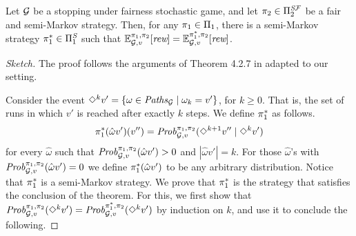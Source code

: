 \begin{theorem}\label{th:semmimarkov2}
  Let $\mathcal{G}$ be a stopping under fairness stochastic game,  and let
  $\pi_{2} \in \Pi^{\textit{S}\mathcal{F}}_{2}$ be a fair and semi-Markov
  strategy. Then, for any $\pi_{1} \in \Pi_{1}$, there is a
  semi-Markov strategy $\pi^*_{1} \in \Pi^{\textit{S}}_{1}$
  such that
  $\mathbb{E}^{\pi_{1}, \pi_{2}}_{\mathcal{G}, v}[\textit{rew}] =
  \mathbb{E}^{\pi^*_{1}, \pi_{2}}_{\mathcal{G}, v}[\textit{rew}]$.
\end{theorem}
%
\begin{proof}[Sketch]
  The proof follows the arguments of Theorem 4.2.7 in \cite{FilarV96}
  adapted to our setting.
	
  Consider the event $\Diamond^{k} v' = \{ \omega \in
  \mathit{Paths}_{\mathcal{G}} \mid \omega_k = v'\}$, for $k\geq 0$. That is,
  the set of runs in which $v'$ is reached after exactly $k$ steps.
  We define $\pi^*_{1}$ as follows.
  \[
  \pi^*_{1}(\hat{\omega}v')(v'') =  \mathit{Prob}^{\pi_{1}, \pi_{2}}_{\mathcal{G},v}(\Diamond^{k+1} v'' \mid \Diamond^k v') 
  \]
  for every $\hat{\omega}$ such that $\mathit{Prob}^{\pi_{1}, \pi_{2}}_{\mathcal{G},v}(\hat{\omega}v') > 0$ and $|\hat{\omega}v'| = k$.  For those $\hat{\omega}$'s with $\mathit{Prob}^{\pi_{1}, \pi_{2}}_{\mathcal{G},v}(\hat{\omega}v') = 0$ we define $\pi^*_{1}(\hat{\omega}v')$ to be any arbitrary distribution.
  Notice that $\pi^*_{1}$ is a semi-Markov strategy.
  We prove that $\pi^*_{1}$ is the strategy that satisfies the
  conclusion of the theorem.
  For this, we first show that $\mathit{Prob}^{\pi_{1}, \pi_{2}}_{\mathcal{G},v}(\Diamond^{k} v') = \mathit{Prob}^{\pi^*_{1}, \pi_{2}}_{\mathcal{G},v}(\Diamond^{k} v')$ by induction on $k$, and use it to conclude the following. 

\end{proof}
